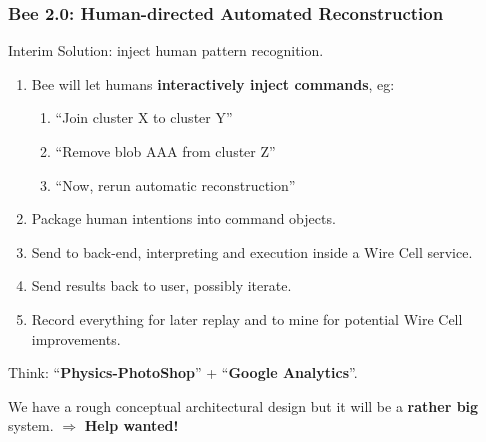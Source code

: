 \documentclass[xcolor=dvipsnames]{beamer}
\begin{document}
\begin{frame}
  \frametitle{Bee 2.0: Human-directed Automated Reconstruction}
  Interim Solution: inject human pattern recognition.
  \begin{enumerate}\footnotesize
  \item Bee will let humans \textbf{interactively inject commands}, eg:
    \begin{enumerate}\scriptsize
    \item ``Join cluster X to cluster Y''
    \item ``Remove blob AAA from cluster Z''
    \item ``Now, rerun automatic reconstruction''
    \end{enumerate}
  \item Package human intentions into command objects.
  \item Send to back-end, interpreting and execution inside a Wire
    Cell service.
  \item Send results back to user, possibly iterate.
  \item Record everything for later replay and to mine for potential
    Wire Cell improvements.
  \end{enumerate}
  Think: ``\textbf{Physics-PhotoShop}'' + ``\textbf{Google Analytics}''.

  \vfill

  We have a rough conceptual architectural design but it will be a
  \textbf{rather big} system.  $\Rightarrow$ \textbf{Help wanted!}

\end{frame}

\end{document}
